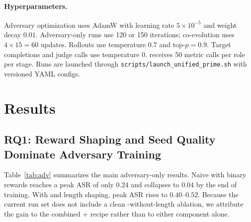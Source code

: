 \paragraph{Hyperparameters.}
Adversary optimization uses AdamW with learning rate $5\times 10^{-5}$ and weight decay $0.01$. 
Adversary-only runs use 120 or 150 iterations;
co-evolution uses $4 \times 15=60$ \rloo{} updates. 
Rollouts use temperature $0.7$ and top-$p=0.9$.
Target completions and judge calls use temperature $0$. 
\gepa{} receives 50 metric calls per role per stage.
Runs are launched through \texttt{scripts/launch\_unified\_prime.sh} with versioned YAML configs.

\section{Results}

\subsection{RQ1: Reward Shaping and Seed Quality Dominate Adversary Training}

Table~\ref{tab:adv} summarizes the main adversary-only results.
Naive \reinforce{} with binary rewards reaches a peak ASR of only $0.24$ and collapses to $0.04$ by the end of training.
With \rloo{} and length shaping, peak ASR rises to $0.40$--$0.52$.
Because the current run set does not include a clean \rloo{}-without-length ablation, we attribute the gain to the combined \rloo{}+\lp{} recipe rather than to either component alone.
\begin{table}[t]
\centering
\caption{
Adversary optimization summary on held-out \harmbench{}. 
Peak ASR is the best evaluation checkpoint observed during training.
}
\label{tab:adv}
\end{table}

